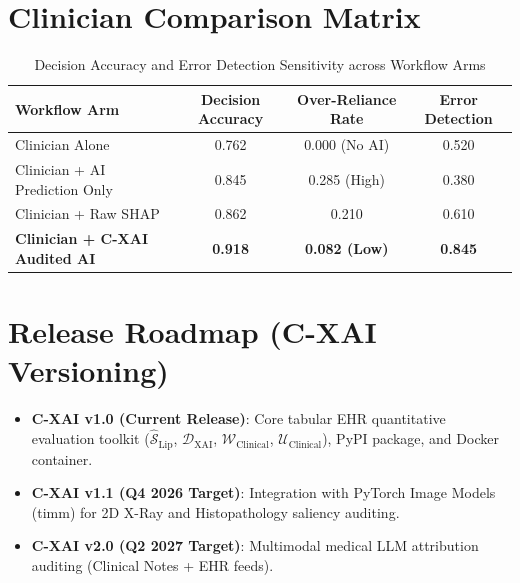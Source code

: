 \documentclass[11pt,a4paper]{article}
\begin{document}
\section{Clinician Comparison Matrix}

\begin{table}[h]
\centering
\caption{Decision Accuracy and Error Detection Sensitivity across Workflow Arms}
\begin{tabular}{lccc}
\toprule
\textbf{Workflow Arm} & \textbf{Decision Accuracy} & \textbf{Over-Reliance Rate} & \textbf{Error Detection} \\
\midrule
Clinician Alone & 0.762 & 0.000 (No AI) & 0.520 \\
Clinician + AI Prediction Only & 0.845 & 0.285 (High) & 0.380 \\
Clinician + Raw SHAP & 0.862 & 0.210 & 0.610 \\
\textbf{Clinician + C-XAI Audited AI} & \textbf{0.918} & \textbf{0.082 (Low)} & \textbf{0.845} \\
\bottomrule
\end{tabular}
\end{table}

\section{Release Roadmap (C-XAI Versioning)}
\begin{itemize}
    \item \textbf{C-XAI v1.0 (Current Release)}: Core tabular EHR quantitative evaluation toolkit ($\widehat{\mathcal{S}}_{\text{Lip}}$, $\mathcal{D}_{\text{XAI}}$, $\mathcal{W}_{\text{Clinical}}$, $\mathcal{U}_{\text{Clinical}}$), PyPI package, and Docker container.
    \item \textbf{C-XAI v1.1 (Q4 2026 Target)}: Integration with PyTorch Image Models (timm) for 2D X-Ray and Histopathology saliency auditing.
    \item \textbf{C-XAI v2.0 (Q2 2027 Target)}: Multimodal medical LLM attribution auditing (Clinical Notes + EHR feeds).
\end{itemize}
\end{document}
